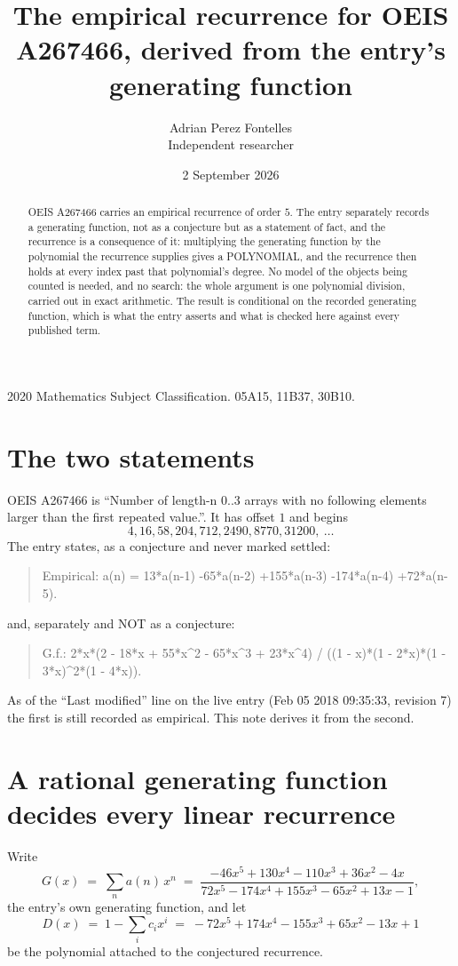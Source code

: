 \documentclass[11pt,a4paper]{article}
\title{The empirical recurrence for OEIS A267466, derived from the entry's generating function}
\author{Adrian Perez Fontelles\\ \small Independent researcher}
\date{2 September 2026}
\theoremstyle{plain}
\theoremstyle{definition}
\begin{document}
\maketitle

\begin{abstract}
OEIS A267466 carries an empirical recurrence of order $5$. The entry separately records a
generating function, not as a conjecture but as a statement of fact, and the recurrence is a
consequence of it: multiplying the generating function by the polynomial the recurrence
supplies gives a POLYNOMIAL, and the recurrence then holds at every index past that
polynomial's degree. No model of the objects being counted is needed, and no search: the
whole argument is one polynomial division, carried out in exact arithmetic. The result is
conditional on the recorded generating function, which is what the entry asserts and what is
checked here against every published term.
\end{abstract}

\noindent\small 2020 Mathematics Subject Classification. 05A15, 11B37, 30B10.\normalsize

\section{The two statements}

OEIS A267466 is ``Number of length-n 0..3 arrays with no following elements larger than the first repeated value.''. It has offset $1$ and begins
\[
4, 16, 58, 204, 712, 2490, 8770, 31200,\ \dots
\]
The entry states, as a conjecture and never marked settled:
\begin{quote}
Empirical: a(n) = 13*a(n-1) -65*a(n-2) +155*a(n-3) -174*a(n-4) +72*a(n-5).
\end{quote}
and, separately and NOT as a conjecture:
\begin{quote}
G.f.: 2*x*(2 - 18*x + 55*x\^{}2 - 65*x\^{}3 + 23*x\^{}4) / ((1 - x)*(1 - 2*x)*(1 - 3*x)\^{}2*(1 - 4*x)).
\end{quote}
As of the ``Last modified'' line on the live entry (Feb 05 2018 09:35:33, revision 7) the first is still
recorded as empirical. This note derives it from the second.

\section{A rational generating function decides every linear recurrence}

Write
\[
G(x)\;=\;\sum_{n}a(n)\,x^{n}\;=\;\frac{- 46 x^{5} + 130 x^{4} - 110 x^{3} + 36 x^{2} - 4 x}{72 x^{5} - 174 x^{4} + 155 x^{3} - 65 x^{2} + 13 x - 1},
\]
the entry's own generating function, and let
\[
D(x)\;=\;1-\sum_i c_i x^{i}\;=\;- 72 x^{5} + 174 x^{4} - 155 x^{3} + 65 x^{2} - 13 x + 1
\]
be the polynomial attached to the conjectured recurrence.
\end{document}
